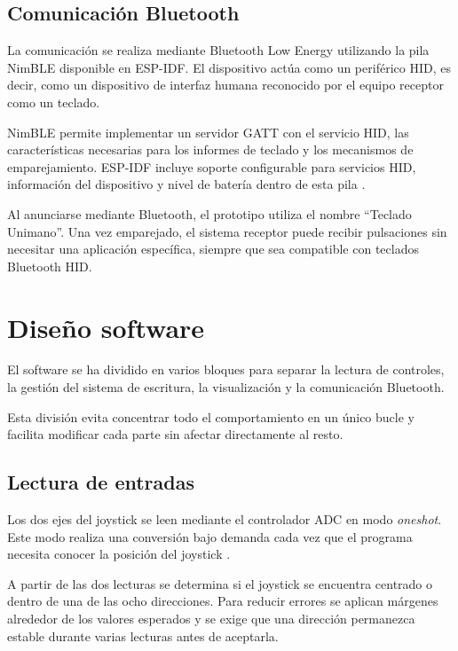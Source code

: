\subsection{Comunicación Bluetooth}
\label{subsec:comunicacion-bluetooth}

La comunicación se realiza mediante Bluetooth Low Energy utilizando la pila NimBLE disponible en ESP-IDF. El dispositivo actúa como un periférico HID, es decir, como un dispositivo de interfaz humana reconocido por el equipo receptor como un teclado.

NimBLE permite implementar un servidor GATT con el servicio HID, las características necesarias para los informes de teclado y los mecanismos de emparejamiento. ESP-IDF incluye soporte configurable para servicios HID, información del dispositivo y nivel de batería dentro de esta pila \cite{espressifNimBLE}.

Al anunciarse mediante Bluetooth, el prototipo utiliza el nombre \enquote{Teclado Unimano}. Una vez emparejado, el sistema receptor puede recibir pulsaciones sin necesitar una aplicación específica, siempre que sea compatible con teclados Bluetooth HID.

\section{Diseño software}
\label{sec:diseno-software}

El software se ha dividido en varios bloques para separar la lectura de controles, la gestión del sistema de escritura, la visualización y la comunicación Bluetooth.

Esta división evita concentrar todo el comportamiento en un único bucle y facilita modificar cada parte sin afectar directamente al resto.

\subsection{Lectura de entradas}
\label{subsec:lectura-entradas}

Los dos ejes del joystick se leen mediante el controlador ADC en modo \textit{oneshot}. Este modo realiza una conversión bajo demanda cada vez que el programa necesita conocer la posición del joystick \cite{espressifADCOneshot}.

A partir de las dos lecturas se determina si el joystick se encuentra centrado o dentro de una de las ocho direcciones. Para reducir errores se aplican márgenes alrededor de los valores esperados y se exige que una dirección permanezca estable durante varias lecturas antes de aceptarla.


